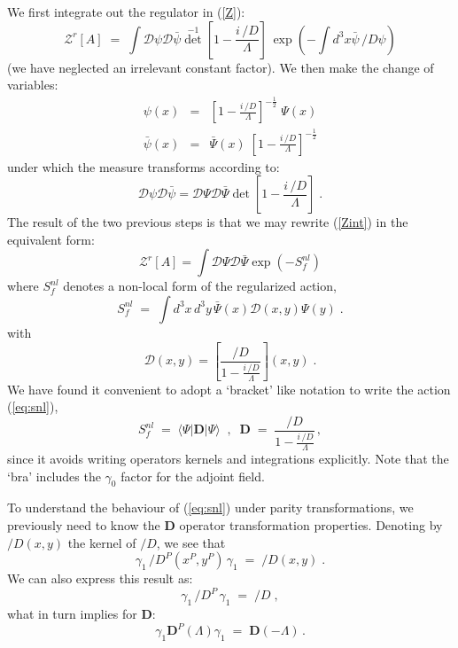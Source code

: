 \documentclass[a4paper,12pt]{article}
\newcommand{\Dcslash}{/\!\!\!\! D}
\begin{document}
We first integrate out the regulator in (\ref{Z}):
\begin{equation}
   \label{Zint}
\mathcal{Z}^r[A] \;=\; \int\mathcal{D}\psi\mathcal{D}\bar{\psi} 
\det^{-1}[1-\frac{i\,\Dcslash}{\Lambda}] \, 
\exp\left(-\int d^3x \bar{\psi}\, \Dcslash\psi\right)
\end{equation}
(we have neglected an irrelevant constant factor). We then make the
change of variables:
\begin{eqnarray}
\label{psitoPsi1}
\psi(x) &=&
\left[1-\frac{i\,\Dcslash}{\Lambda}\right]^{-\frac{1}{2}}
\;\Psi(x) \\
\label{psitoPsi2}
\bar{\psi}(x)&=&\bar{\Psi}(x)\;
\left[1-\frac{i\,\Dcslash}{\Lambda}\right]^{-\frac{1}{2}}
\end{eqnarray}
under which the measure transforms according to:
\begin{equation}
\mathcal{D}\psi\mathcal{D}\bar{\psi}=\mathcal{D}\Psi\mathcal{D}\bar{\Psi}
\det [1-\frac{i\,\Dcslash}{\Lambda}]\;.
\end{equation}
The result of the two previous steps is that we may rewrite
(\ref{Zint}) in the equivalent form:
\begin{equation}
\label{eq:snlp}
\mathcal{Z}^r[A]=\int\mathcal{D}\Psi\mathcal{D}\bar{\Psi} 
\exp(- S_f^{nl})
\end{equation}
where $S_f^{nl}$ denotes a non-local form of the regularized action,
\begin{equation}
  \label{eq:snl}
  S_f^{nl}\;=\; \int d^3x\,d^3y\, \bar{\Psi}(x) \mathcal{D}(x,y) \Psi(y) \;.
\label{efact}
\end{equation}
with
\begin{equation}
{\mathcal
  D}(x,y)=\left[\frac{\Dcslash}{1-\displaystyle{\frac{i\,\Dcslash}{\Lambda}}}\right]
(x,y) \;.
\end{equation}
We have found it convenient to adopt a `bracket' like notation to
write the action (\ref{eq:snl}),
\begin{equation}
  \label{eq:snl1}
  S_f^{nl}\;=\; \langle\Psi|\mathbf{D}|\Psi\rangle \;\;,\;\; 
{\mathbf D}\;=\; \frac{\Dcslash}{1-\displaystyle{\frac{i\,\Dcslash}{\Lambda}}}\,,
\end{equation}
since it avoids writing operators kernels and integrations explicitly.
Note that the `bra' includes the $\gamma_0$ factor for the adjoint
field.

To understand the behaviour of (\ref{eq:snl}) under parity
transformations, we previously need to know the ${\mathbf D}$ operator
transformation properties. Denoting by $\Dcslash(x,y)$ the kernel of
$\Dcslash$, we see that
\begin{equation}
\gamma_1 \,\Dcslash^P(x^P,y^P) \,\gamma_1 \;=\; \Dcslash(x,y) \;.
\end{equation}
We can also express this result as:
\begin{equation}
\label{Dcparity}
\gamma_1\, \Dcslash^P \,\gamma_1 \;=\;\Dcslash \;,
\end{equation}
what in turn implies for ${\mathbf D}$:
\begin{equation}
\label{DParity}
\gamma_1{\mathbf D}^P(\Lambda)\gamma_1 \;=\; {\mathbf D(-\Lambda)}\,.
\end{equation}
\end{document}

